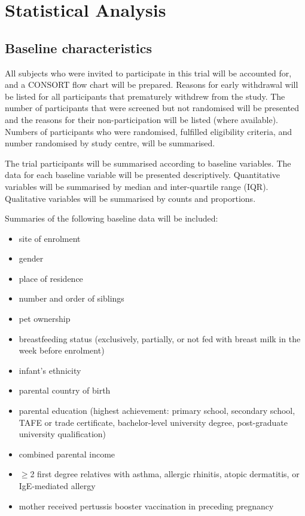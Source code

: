\documentclass{bmcart}
\begin{document}
\section*{Statistical Analysis}

\subsection*{Baseline characteristics}

All subjects who were invited to participate in this trial will be accounted for, and a CONSORT flow chart will be prepared.
Reasons for early withdrawal will be listed for all participants that prematurely withdrew from the study.
The number of participants that were screened but not randomised will be presented and the reasons for their non-participation will be listed (where available).
Numbers of participants who were randomised, fulfilled eligibility criteria, and number randomised by study centre, will be summarised.

The trial participants will be summarised according to baseline variables.
The data for each baseline variable will be presented descriptively.
Quantitative variables will be summarised by median and inter-quartile range (IQR).
Qualitative variables will be summarised by counts and proportions.

Summaries of the following baseline data will be included:

\begin{itemize}
	\item site of enrolment
	\item gender
	\item place of residence
	\item number and order of siblings
	\item pet ownership
	\item breastfeeding status (exclusively, partially, or not fed with breast milk in the week before enrolment)
	\item infant's ethnicity
	\item parental country of birth
	\item parental education (highest achievement: primary school, secondary school, TAFE or trade certificate, bachelor-level university degree, post-graduate university qualification)
	\item combined parental income
	\item $\geq$2 first degree relatives with asthma, allergic rhinitis, atopic dermatitis, or IgE-mediated allergy
	\item mother received pertussis booster vaccination in preceding pregnancy
\end{itemize}
\end{document}

